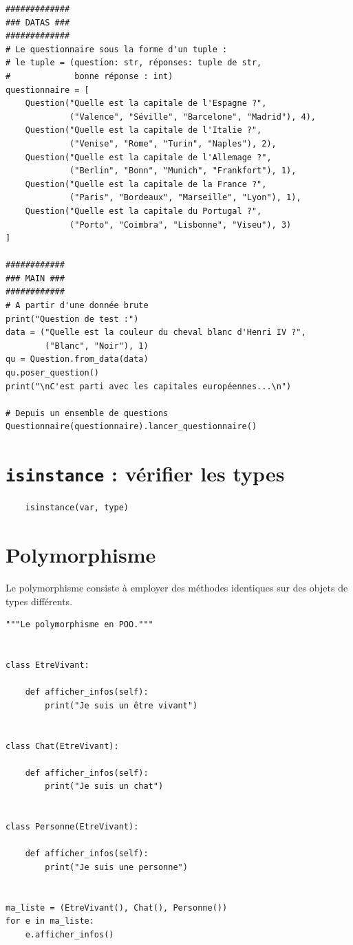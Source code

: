 \documentclass[a4paper,12pt]{book}
\begin{document}
\begin{lstlisting}
#############
### DATAS ###
#############
# Le questionnaire sous la forme d'un tuple :
# le tuple = (question: str, réponses: tuple de str, 
#             bonne réponse : int)
questionnaire = [
    Question("Quelle est la capitale de l'Espagne ?",
             ("Valence", "Séville", "Barcelone", "Madrid"), 4),
    Question("Quelle est la capitale de l'Italie ?",
             ("Venise", "Rome", "Turin", "Naples"), 2),
    Question("Quelle est la capitale de l'Allemage ?",
             ("Berlin", "Bonn", "Munich", "Frankfort"), 1),
    Question("Quelle est la capitale de la France ?",
             ("Paris", "Bordeaux", "Marseille", "Lyon"), 1),
    Question("Quelle est la capitale du Portugal ?",
             ("Porto", "Coimbra", "Lisbonne", "Viseu"), 3)
]

############
### MAIN ###
############
# A partir d'une donnée brute
print("Question de test :")
data = ("Quelle est la couleur du cheval blanc d'Henri IV ?",
        ("Blanc", "Noir"), 1)
qu = Question.from_data(data)
qu.poser_question()
print("\nC'est parti avec les capitales européennes...\n")

# Depuis un ensemble de questions
Questionnaire(questionnaire).lancer_questionnaire()
\end{lstlisting}
\medskip

\section{\texttt{isinstance} : vérifier les types}
\begin{verbatim}
    isinstance(var, type)
\end{verbatim}
\medskip

\section{Polymorphisme}
Le polymorphisme consiste à employer des méthodes identiques sur des objets de types différents.
\begin{lstlisting}
"""Le polymorphisme en POO."""


class EtreVivant:

    def afficher_infos(self):
        print("Je suis un être vivant")


class Chat(EtreVivant):

    def afficher_infos(self):
        print("Je suis un chat")


class Personne(EtreVivant):

    def afficher_infos(self):
        print("Je suis une personne")


ma_liste = (EtreVivant(), Chat(), Personne())
for e in ma_liste:
    e.afficher_infos()
\end{lstlisting}
\medskip
\end{document}
